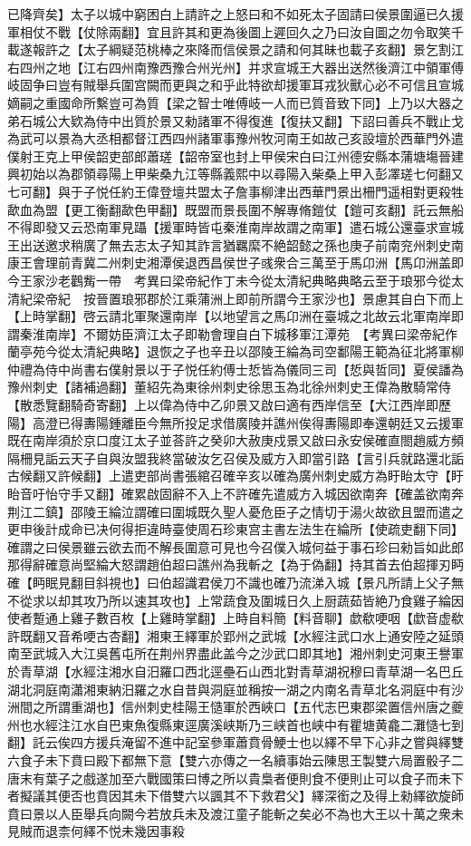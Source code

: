 已降齊矣】太子以城中窮困白上請許之上怒曰和不如死太子固請曰侯景圍逼已久援軍相仗不戰【仗除兩翻】宜且許其和更為後圖上遲回久之乃曰汝自圖之勿令取笑千載遂報許之【太子綱疑范桃棒之來降而信侯景之請和何其昧也載子亥翻】景乞割江右四州之地【江右四州南豫西豫合州光州】并求宣城王大器出送然後濟江中領軍傅岐固争曰豈有賊舉兵圍宫闕而更與之和乎此特欲却援軍耳戎狄獸心必不可信且宣城嫡嗣之重國命所繫豈可為質【梁之智士唯傅岐一人而已質音致下同】上乃以大器之弟石城公大欵為侍中出質於景又勑諸軍不得復進【復扶又翻】下詔曰善兵不戰止戈為武可以景為大丞相都督江西四州諸軍事豫州牧河南王如故己亥設壇於西華門外遣僕射王克上甲侯韶吏部郎蕭瑳【韶帝室也封上甲侯宋白曰江州德安縣本蒲塘塲晉建興初始以為郡領尋陽上甲柴桑九江等縣義熙中以尋陽入柴桑上甲入彭凙瑳七何翻又七可翻】與于子悦任約王偉登壇共盟太子詹事柳津出西華門景出柵門遥相對更殺牲歃血為盟【更工衡翻歃色甲翻】既盟而景長圍不解專脩鎧仗【鎧可亥翻】託云無船不得即發又云恐南軍見躡【援軍時皆屯秦淮南岸故謂之南軍】遣石城公還臺求宣城王出送邀求稍廣了無去志太子知其詐言猶羈縻不絶韶懿之孫也庚子前南兖州刺史南康王會理前青冀二州刺史湘潭侯退西昌侯世子彧衆合三萬至于馬卬洲【馬卬洲盖即今王家沙老鸛觜一帶　考異曰梁帝紀作丁未今從太清紀典略典略云至于琅邪今從太清紀梁帝紀　按晉置琅邪郡於江乘蒲洲上即前所謂今王家沙也】景慮其自白下而上【上時掌翻】啓云請北軍聚還南岸【以地望言之馬卬洲在臺城之北故云北軍南岸即謂秦淮南岸】不爾妨臣濟江太子即勒會理自白下城移軍江潭苑　【考異曰梁帝紀作蘭亭苑今從太清紀典略】退恢之子也辛丑以邵陵王綸為司空鄱陽王範為征北將軍柳仲禮為侍中尚書右僕射景以于子悦任約傅士悊皆為儀同三司【悊與哲同】夏侯譒為豫州刺史【諸補過翻】董紹先為東徐州刺史徐思玉為北徐州刺史王偉為散騎常侍【散悉覽翻騎奇寄翻】上以偉為侍中乙卯景又啟曰適有西岸信至【大江西岸即歷陽】高澄已得夀陽鍾離臣今無所投足求借廣陵并譙州俟得夀陽即奉還朝廷又云援軍既在南岸須於京口度江太子並荅許之癸卯大赦庚戍景又啟曰永安侯確直閤趙威方頻隔柵見詬云天子自與汝盟我終當破汝乞召侯及威方入即當引路【言引兵就路還北詬古候翻又許候翻】上遣吏部尚書張綰召確辛亥以確為廣州刺史威方為盱眙太守【盱眙音吁怡守手又翻】確累啟固辭不入上不許確先遣威方入城因欲南奔【確盖欲南奔荆江二鎮】邵陵王綸泣謂確曰圍城既久聖人憂危臣子之情切于湯火故欲且盟而遣之更申後計成命已决何得拒違時臺使周石珍東宫主書左法生在綸所【使疏吏翻下同】確謂之曰侯景雖云欲去而不解長圍意可見也今召僕入城何益于事石珍曰勑旨如此郎那得辭確意尚堅綸大怒謂趙伯超曰譙州為我斬之【為于偽翻】持其首去伯超揮刃眄確【眄眠見翻目斜視也】曰伯超識君侯刀不識也確乃流涕入城【景凡所請上父子無不從求以却其攻乃所以速其攻也】上常蔬食及圍城日久上厨蔬茹皆絶乃食雞子綸因使者蹔通上雞子數百枚【上雞時掌翻】上時自料簡【料音聊】歔欷哽咽【歔音虚欷許既翻又音希哽古杏翻】湘東王繹軍於郢州之武城【水經注武口水上通安陸之延頭南至武城入大江吳舊屯所在荆州界盡此盖今之沙武口即其地】湘州刺史河東王譽軍於青草湖【水經注湘水自汨羅口西北逕壘石山西北對青草湖祝穆曰青草湖一名巴丘湖北洞庭南瀟湘東納汨羅之水自昔與洞庭並稱按一湖之内南名青草北名洞庭中有沙洲間之所謂重湖也】信州刺史桂陽王慥軍於西峽口【五代志巴東郡梁置信州唐之夔州也水經注江水自巴東魚復縣東逕廣溪峡斯乃三峡首也峡中有瞿塘黄龕二灘慥七到翻】託云俟四方援兵淹留不進中記室參軍蕭賁骨鯁士也以繹不早下心非之嘗與繹雙六食子未下賁曰殿下都無下意【雙六亦傳之一名續事始云陳思王製雙六局置骰子二唐末有葉子之戲遂加至六戰國策曰博之所以貴梟者便則食不便則止可以食子而未下者擬議其便否也賁因其未下借雙六以諷其不下救君父】繹深銜之及得上勑繹欲旋師賁曰景以人臣舉兵向闕今若放兵未及渡江童子能斬之矣必不為也大王以十萬之衆未見賊而退柰何繹不悦未幾因事殺